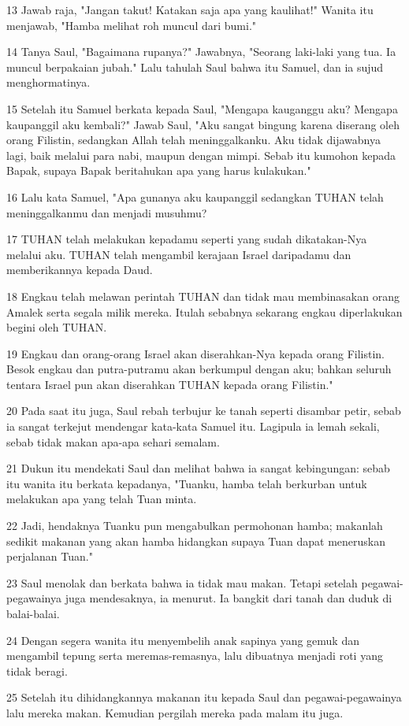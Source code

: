 \par 13 Jawab raja, "Jangan takut! Katakan saja apa yang kaulihat!" Wanita itu menjawab, "Hamba melihat roh muncul dari bumi."
\par 14 Tanya Saul, "Bagaimana rupanya?" Jawabnya, "Seorang laki-laki yang tua. Ia muncul berpakaian jubah." Lalu tahulah Saul bahwa itu Samuel, dan ia sujud menghormatinya.
\par 15 Setelah itu Samuel berkata kepada Saul, "Mengapa kauganggu aku? Mengapa kaupanggil aku kembali?" Jawab Saul, "Aku sangat bingung karena diserang oleh orang Filistin, sedangkan Allah telah meninggalkanku. Aku tidak dijawabnya lagi, baik melalui para nabi, maupun dengan mimpi. Sebab itu kumohon kepada Bapak, supaya Bapak beritahukan apa yang harus kulakukan."
\par 16 Lalu kata Samuel, "Apa gunanya aku kaupanggil sedangkan TUHAN telah meninggalkanmu dan menjadi musuhmu?
\par 17 TUHAN telah melakukan kepadamu seperti yang sudah dikatakan-Nya melalui aku. TUHAN telah mengambil kerajaan Israel daripadamu dan memberikannya kepada Daud.
\par 18 Engkau telah melawan perintah TUHAN dan tidak mau membinasakan orang Amalek serta segala milik mereka. Itulah sebabnya sekarang engkau diperlakukan begini oleh TUHAN.
\par 19 Engkau dan orang-orang Israel akan diserahkan-Nya kepada orang Filistin. Besok engkau dan putra-putramu akan berkumpul dengan aku; bahkan seluruh tentara Israel pun akan diserahkan TUHAN kepada orang Filistin."
\par 20 Pada saat itu juga, Saul rebah terbujur ke tanah seperti disambar petir, sebab ia sangat terkejut mendengar kata-kata Samuel itu. Lagipula ia lemah sekali, sebab tidak makan apa-apa sehari semalam.
\par 21 Dukun itu mendekati Saul dan melihat bahwa ia sangat kebingungan: sebab itu wanita itu berkata kepadanya, "Tuanku, hamba telah berkurban untuk melakukan apa yang telah Tuan minta.
\par 22 Jadi, hendaknya Tuanku pun mengabulkan permohonan hamba; makanlah sedikit makanan yang akan hamba hidangkan supaya Tuan dapat meneruskan perjalanan Tuan."
\par 23 Saul menolak dan berkata bahwa ia tidak mau makan. Tetapi setelah pegawai-pegawainya juga mendesaknya, ia menurut. Ia bangkit dari tanah dan duduk di balai-balai.
\par 24 Dengan segera wanita itu menyembelih anak sapinya yang gemuk dan mengambil tepung serta meremas-remasnya, lalu dibuatnya menjadi roti yang tidak beragi.
\par 25 Setelah itu dihidangkannya makanan itu kepada Saul dan pegawai-pegawainya lalu mereka makan. Kemudian pergilah mereka pada malam itu juga.

